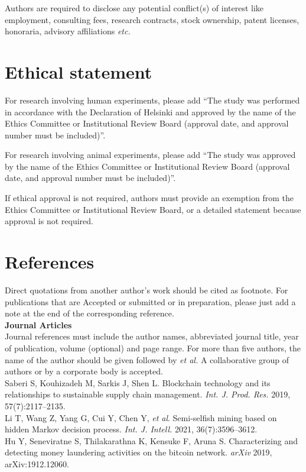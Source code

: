 \documentclass{ELSP}
\begin{document}
Authors are required to disclose any potential
conflict(s) of interest like employment, consulting fees, research
contracts, stock ownership, patent licenses, honoraria, advisory
affiliations \textit{etc.}

\section*{Ethical statement}

For research involving human experiments, please add “The study was performed in accordance with the Declaration of Helsinki and approved by the name of the Ethics Committee or Institutional Review Board (approval date, and approval number must be included)”.

For research involving animal experiments, please add “The study was approved by the name of the Ethics Committee or Institutional Review Board (approval date, and approval number must be included)”.

If ethical approval is not required, authors must provide an exemption from the Ethics Committee or Institutional Review Board, or a detailed statement because approval is not required.

\section*{References}

Direct quotations from another author's work should be cited as footnote. For publications that are Accepted or submitted or in preparation, please just add a note at the end of the corresponding reference. \\

\noindent \textbf{Journal Articles}\\
\noindent Journal references must include the author names, abbreviated journal title, year of publication, volume (optional) and page range. For more than five authors, the name of the author should be given followed by \textit{et al.} A collaborative group of authors or by a corporate body is accepted. \\
\noindent [1] Saberi S, Kouhizadeh M, Sarkis J, Shen L. Blockchain technology and its relationships to sustainable 
supply chain management. \textit{Int. J. Prod. Res.} 2019, 57(7):2117--2135.\\
\noindent [2] Li T, Wang Z, Yang G, Cui Y, Chen Y, \textit{et al}. Semi-selfish mining based on hidden Markov decision
process. \textit{Int. J. Intell.} 2021, 36(7):3596--3612. \\
\noindent [3] Hu Y, Seneviratne S, Thilakarathna K, Kensuke F, Aruna S. Characterizing and detecting money laundering activities on the bitcoin network. \textit{arXiv} 2019, arXiv:1912.12060.\\
\end{document}
